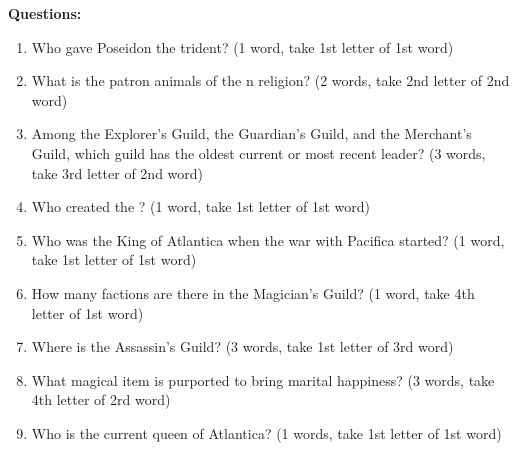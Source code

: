 \documentclass[green]{NeptuneBall}
\begin{document}
{\bf Questions:}
\begin{enumerate}
 \item Who gave Poseidon the trident? (1 word, take 1st letter of 1st word) \vspace{3 mm}\\  \underline{\hspace{15cm}}
 \item What is the patron animals of the \pAtlantis{}n religion? (2 words, take 2nd letter of 2nd word) \vspace{3 mm}\\ \underline{\hspace{15cm}}
	\item Among the Explorer's Guild, the Guardian's Guild, and the Merchant's Guild, which guild has the oldest current or most recent leader? (3 words, take 3rd letter of 2nd word) \vspace{3 mm}\\ \underline{\hspace{15cm}}
	\item Who created the \sArtifactTwo{}? (1 word, take 1st letter of 1st word) \vspace{3 mm}\\ \underline{\hspace{15cm}}
	\item Who was the King of Atlantica when the war with Pacifica started? (1 word, take 1st letter of 1st word) \vspace{3 mm}\\ \underline{\hspace{15cm}}
	\item How many factions are there in the Magician's Guild? (1 word, take 4th letter of 1st word) \vspace{3 mm}\\ \underline{\hspace{15cm}}
	\item Where is the Assassin's Guild? (3 words, take 1st letter of 3rd word) \vspace{3 mm}\\ \underline{\hspace{15cm}}
	\item What magical item is purported to bring marital happiness? (3 words, take 4th letter of 2rd word) \vspace{3 mm}\\ \underline{\hspace{15cm}}
	\item Who is the current queen of Atlantica? (1 words, take 1st letter of 1st word) \vspace{3 mm}\\ \underline{\hspace{15cm}}

\end{enumerate}
\end{document}
